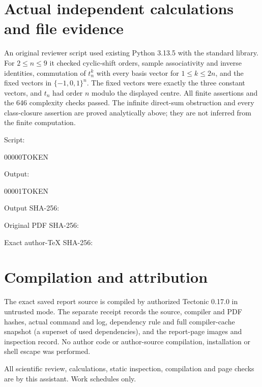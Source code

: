\documentclass[10pt]{article}
\begin{document}
\section*{Actual independent calculations and file evidence}
An original reviewer script used existing Python 3.13.5 with the standard library. For \(2\leq n\leq9\) it checked cyclic-shift orders, sample associativity and inverse identities, commutation of \(t_n^k\) with every basis vector for \(1\leq k\leq2n\), and the fixed vectors in \(\{-1,0,1\}^n\). The fixed vectors were exactly the three constant vectors, and \(t_n\) had order \(n\) modulo the displayed centre. All finite assertions and the 646 complexity checks passed. The infinite direct-sum obstruction and every class-closure assertion are proved analytically above; they are not inferred from the finite computation.\par
Script:\par
00000TOKEN\par
Output:\par
00001TOKEN\par
Output SHA-256:\par
Original PDF SHA-256:\par
Exact author-TeX SHA-256:\par
\section*{Compilation and attribution}
The exact saved report source is compiled by authorized Tectonic 0.17.0 in untrusted mode. The separate receipt records the source, compiler and PDF hashes, actual command and log, dependency rule and full compiler-cache snapshot (a superset of used dependencies), and the report-page images and inspection record. No author code or author-source compilation, installation or shell escape was performed.\par
All scientific review, calculations, static inspection, compilation and page checks are by this assistant. Work schedules only.\par
\end{document}
